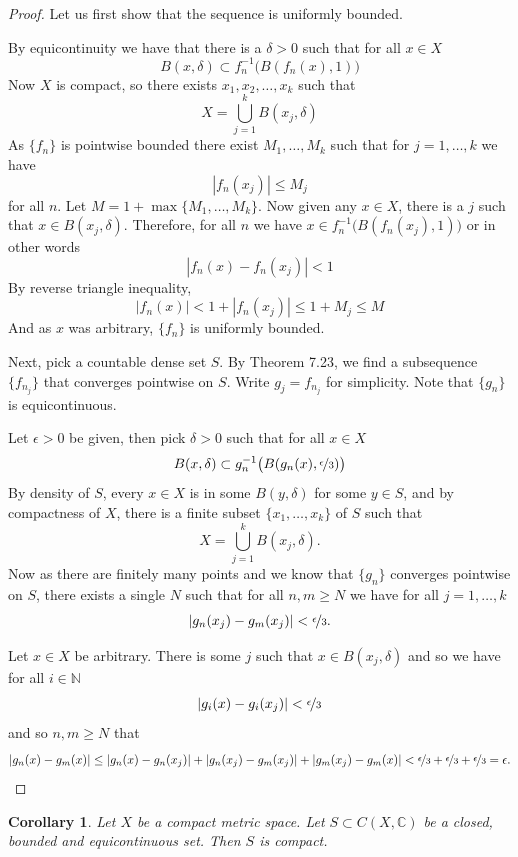 \documentclass[12pt]{book}
\newcommand{\abs}[1]{\left\lvert {#1} \right\rvert}
\newcommand{\C}{{\mathbb{C}}}
\newcommand{\N}{{\mathbb{N}}}
\theoremstyle{plain}
\newtheorem{cor}[thm]{Corollary}
\theoremstyle{remark}
\theoremstyle{definition}
\theoremstyle{exercise}
\theoremstyle{example}
\begin{document}
\begin{proof}
Let us first show that the sequence is uniformly bounded.

By equicontinuity we have that there is a $\delta > 0$
such that for all $x \in X$
$$
B(x,\delta) \subset f_n^{-1}\bigl(B(f_n(x),1)\bigr)
$$
Now $X$ is compact, so there exists $x_1,x_2,\ldots,x_k$
such that
$$
X = \bigcup_{j=1}^k B(x_j,\delta)
$$
As $\{ f_n \}$ is pointwise bounded there exist $M_1,\ldots,M_k$
such that for $j=1,\ldots,k$ we have
$$
\abs{f_n(x_j)} \leq M_j
$$
for all $n$.  Let $M = 1+ \max \{ M_1,\ldots,M_k \}$.  Now given any
$x \in X$, there is a $j$ such that $x \in B(x_j,\delta)$.  Therefore,
for all $n$ we have
$x \in f_n^{-1}\bigl(B(f_n(x_j),1)\bigr)$ or in other words
$$
\abs{f_n(x)-f_n(x_j)} < 1
$$
By reverse triangle inequality,
$$
\abs{f_n(x)} < 1+ \abs{f_n(x_j)} \leq 1+M_j \leq M
$$
And as $x$ was arbitrary, $\{f_n\}$ is uniformly bounded.


Next, pick a countable dense set $S$.  By Theorem 7.23, we find
a subsequence $\{ f_{n_j} \}$ that converges pointwise on $S$.
Write $g_j = f_{n_j}$ for simplicity.  Note that $\{ g_n \}$ is 
equicontinuous.

Let $\epsilon > 0$ be given, then pick $\delta > 0$
such that for all $x \in X$
$$
B(x,\delta) \subset g_n^{-1}\bigl(B(g_n(x),\nicefrac{\epsilon}{3})\bigr)
$$
By density of $S$, every $x \in X$ is in some $B(y,\delta)$
for some $y \in S$, and by compactness of $X$,
there is a finite subset $\{ x_1,\ldots,x_k \}$ of $S$
such that
$$
X = \bigcup_{j=1}^k B(x_j,\delta) .
$$
Now as there are finitely many points and we know that $\{ g_n \}$
converges pointwise on $S$, there exists a single $N$ such that for 
all $n,m \geq N$ we have for all $j=1,\ldots,k$
\begin{equation*}
\abs{g_n(x_j)-g_m(x_j)} < \nicefrac{\epsilon}{3} .
\end{equation*}

Let $x \in X$ be arbitrary.  There is some $j$ such that
$x \in B(x_j,\delta)$ and so we have for all $i \in \N$
$$
\abs{g_i(x)-g_i(x_j)} < \nicefrac{\epsilon}{3}
$$
and so $n,m \geq N$ that
$$
\abs{g_n(x)-g_m(x)} \leq
\abs{g_n(x)-g_n(x_j)} +
\abs{g_n(x_j)-g_m(x_j)} +
\abs{g_m(x_j)-g_m(x)} <
\nicefrac{\epsilon}{3} +
\nicefrac{\epsilon}{3} +
\nicefrac{\epsilon}{3} = \epsilon .
$$
\end{proof}

\begin{cor}
Let $X$ be a compact metric space.
Let $S \subset C(X,\C)$ be a closed, bounded and equicontinuous set.
Then $S$ is compact.
\end{cor}
\end{document}

